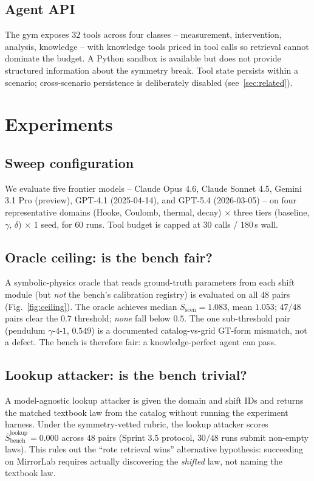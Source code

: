 \documentclass{article}
\begin{document}
\subsection{Agent API}
The gym exposes $32$ tools across four classes -- measurement,
intervention, analysis, knowledge -- with knowledge tools priced in
tool calls so retrieval cannot dominate the budget. A Python sandbox is
available but does not provide structured information about the
symmetry break. Tool state persists within a scenario; cross-scenario
persistence is deliberately disabled (see~\ref{sec:related}).

\section{Experiments}
\label{sec:exp}

\subsection{Sweep configuration}
We evaluate five frontier models -- Claude Opus 4.6, Claude Sonnet 4.5,
Gemini 3.1 Pro (preview), GPT-4.1 (2025-04-14), and GPT-5.4 (2026-03-05)
-- on four representative domains (Hooke, Coulomb, thermal, decay)
$\times$ three tiers (baseline, $\gamma$, $\delta$) $\times$ $1$ seed,
for $60$ runs. Tool budget is capped at $30$ calls / $180\,$s wall.

\subsection{Oracle ceiling: is the bench fair?}
A symbolic-physics oracle that reads ground-truth parameters from each
shift module (but \emph{not} the bench's calibration registry) is
evaluated on all $48$ pairs (Fig.~\ref{fig:ceiling}). The oracle
achieves median $S_{\mathrm{scen}}=1.083$, mean $1.053$; $47/48$ pairs
clear the $0.7$ threshold; \emph{none} fall below $0.5$. The one
sub-threshold pair (pendulum $\gamma$-$4$-$1$, $0.549$) is a documented
catalog-vs-grid GT-form mismatch, not a defect. The bench is therefore
fair: a knowledge-perfect agent can pass.

\subsection{Lookup attacker: is the bench trivial?}
A model-agnostic lookup attacker is given the domain and shift IDs and
returns the matched textbook law from the catalog without running the
experiment harness. Under the symmetry-vetted rubric, the lookup
attacker scores $\bar S_{\mathrm{bench}}^{\mathrm{lookup}} = 0.000$
across $48$ pairs (Sprint 3.5 protocol, $30/48$ runs submit non-empty
laws). This rules out the ``rote retrieval wins'' alternative
hypothesis: succeeding on MirrorLab requires actually discovering the
\emph{shifted} law, not naming the textbook law.
\end{document}
